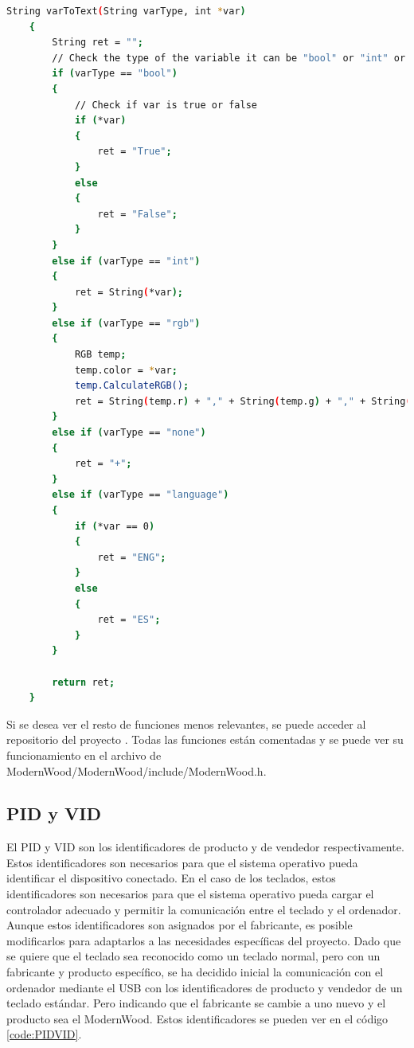 \begin{lstlisting}[style=console, language=bash, caption={Funciones para mostrar y editar las variables de le \gls{EEPROM}}, label={code:ConfigEEPROM}]
    String varToText(String varType, int *var)
    {
        String ret = "";
        // Check the type of the variable it can be "bool" or "int" or "rgb" or "none"
        if (varType == "bool")
        {
            // Check if var is true or false
            if (*var)
            {
                ret = "True";
            }
            else
            {
                ret = "False";
            }
        }
        else if (varType == "int")
        {
            ret = String(*var);
        }
        else if (varType == "rgb")
        {
            RGB temp;
            temp.color = *var;
            temp.CalculateRGB();
            ret = String(temp.r) + "," + String(temp.g) + "," + String(temp.b);
        }
        else if (varType == "none")
        {
            ret = "+";
        }
        else if (varType == "language")
        {
            if (*var == 0)
            {
                ret = "ENG";
            }
            else
            {
                ret = "ES";
            }
        }

        return ret;
    }
\end{lstlisting}

Si se desea ver el resto de funciones menos relevantes, se puede acceder al repositorio del proyecto \cite{ModernWoodGitHub}. Todas las funciones están comentadas y se puede ver su funcionamiento en el archivo de ModernWood/ModernWood/include/ModernWood.h.

\subsection{PID y VID}\label{ApendicePIDVID}

El \gls{PID} y \gls{VID} son los identificadores de producto y de vendedor respectivamente. Estos identificadores son necesarios para que el sistema operativo pueda identificar el dispositivo conectado. En el caso de los teclados, estos identificadores son necesarios para que el sistema operativo pueda cargar el controlador adecuado y permitir la comunicación entre el teclado y el ordenador. Aunque estos identificadores son asignados por el fabricante, es posible modificarlos para adaptarlos a las necesidades específicas del proyecto. Dado que se quiere que el teclado sea reconocido como un teclado normal, pero con un fabricante y producto específico, se ha decidido inicial la comunicación con el ordenador mediante el \gls{USB} con los identificadores de producto y vendedor de un teclado estándar. Pero indicando que el fabricante se cambie a uno nuevo y el producto sea el ModernWood. Estos identificadores se pueden ver en el código \ref{code:PIDVID}.


